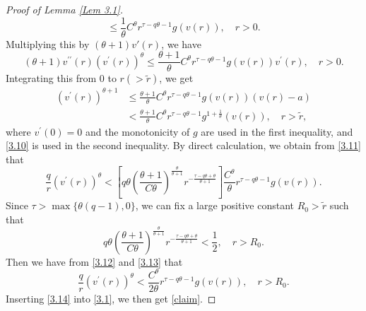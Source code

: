 \documentclass[10pt,a4paper]{amsart}
\begin{document}
\begin{proof}[Proof of Lemma \ref{Lem 3.1}]
\begin{equation*}
\le \frac{1}{\theta} C^\theta r^{\tau - q\theta -1} g(v(r)), \quad r>0.
\end{equation*}
Multiplying this by $(\theta+1)v'(r)$, we have
\begin{equation*}
(\theta+1)v^{\prime\prime}(r)\left( v^{\prime}(r)\right)^{\theta}
\le \frac{\theta + 1}{\theta} C^\theta r^{\tau - q\theta -1} g(v(r)) v^{\prime}(r), \quad r>0.
\end{equation*}
Integrating this from $0$ to $r(>\tilde r)$, we get
\begin{equation}\label{3.11}
\begin{aligned}
		\left(v^{\prime}(r)\right)^{\theta + 1} & \le \frac{\theta + 1}{\theta} C^\theta r^{\tau - q\theta -1} g(v(r))(v(r)-a) \\
		& < \frac{\theta + 1}{\theta} C^\theta r^{\tau - q\theta -1} g^{1+\frac{1}{\theta}}(v(r)), \quad r> \tilde r,
\end{aligned}
\end{equation}
where $v^\prime(0)=0$ and the monotonicity of $g$ are used in the first inequality, and \eqref{3.10} is used in the second inequality.
By direct calculation, we obtain from \eqref{3.11} that
\begin{equation}\label{3.12}
\frac{q}{r}\left( v^{\prime}(r)\right)^{\theta}< \left[ q \theta \left (\frac{\theta+1}{C\theta} \right )^{\frac{\theta}{\theta+1}}r^{-\frac{\tau - q\theta + \theta}{\theta+1}}\right ]\frac{C^\theta}{\theta} r^{\tau - q \theta -1} g(v(r)).
\end{equation}
Since $\tau > \max \{\theta (q-1), 0\}$, we can fix a large positive constant $R_0 > \tilde r$ such that
\begin{equation}\label{3.13}
q \theta \left (\frac{\theta+1}{C\theta} \right )^{\frac{\theta}{\theta+1}}r^{-\frac{\tau - q\theta + \theta}{\theta+1}} < \frac{1}{2}, \quad r>R_0.
\end{equation}
Then we have from \eqref{3.12} and \eqref{3.13} that 
\begin{equation}\label{3.14}
\frac{q}{r}\left( v^{\prime}(r)\right)^{\theta}< \frac{C^\theta}{2\theta} r^{\tau - q \theta -1} g(v(r)),\quad r>R_0.
\end{equation}
Inserting \eqref{3.14} into \eqref{3.1}, we then get \eqref{claim}.
\end{proof}
\end{document}
